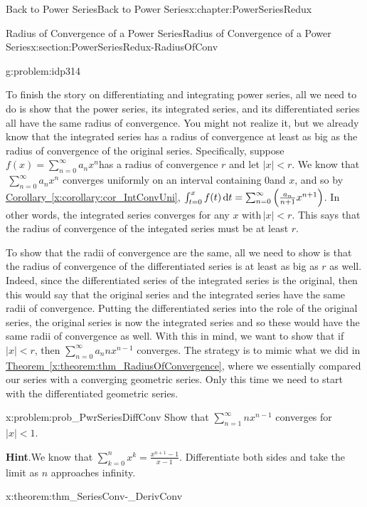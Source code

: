 \begin{chapterptx}{Back to Power Series}{}{Back to Power Series}{}{}{x:chapter:PowerSeriesRedux}
\begin{sectionptx}{Radius of Convergence of a Power Series}{}{Radius of Convergence of a Power Series}{}{}{x:section:PowerSeriesRedux-RadiusOfConv}
\begin{problem}{}{g:problem:idp314}
		\end{problem}
		To finish the story on differentiating and integrating power series, all we need to do is show that the power series, its integrated series, and its differentiated series all have the same radius of convergence. You might not realize it, but we already know that the integrated series has a radius of convergence at least as big as the radius of convergence of the original series. Specifically, suppose \(f(x)=\sum_{n=0}^\infty a_nx^n\)has a radius of convergence \(r\) and let \(|x|\lt r\). We know that \(\,\sum_{n=0}^\infty a_nx^n\) converges uniformly on an interval containing \(0\)and \(x\), and so by \hyperref[x:corollary:cor_IntConvUni]{Corollary~{\xreffont\ref{x:corollary:cor_IntConvUni}}}, \(\int_{t=0}^xf(t)\,{\rm d} t=\sum_{n=0}^\infty\left(\frac{a_n}{n+1}x^{n+1}\right)\). In other words, the integrated series converges for any \(x\) with\(\,|x|\lt r\). This says that the radius of convergence of the integated series must be at least \(r\).%
		\par
		To show that the radii of convergence are the same, all we need to show is that the radius of convergence of the differentiated series is at least as big as \(r\) as well. Indeed, since the differentiated series of the integrated series is the original, then this would say that the original series and the integrated series have the same radii of convergence. Putting the differentiated series into the role of the original series, the original series is now the integrated series and so these would have the same radii of convergence as well. With this in mind, we want to show that if \(|x|\lt r\), then \(\sum_{n=0}^\infty a_nnx^{n-1}\) converges. The strategy is to mimic what we did in \hyperref[x:theorem:thm_RadiusOfConvergence]{Theorem~{\xreffont\ref{x:theorem:thm_RadiusOfConvergence}}}, where we essentially compared our series with a converging geometric series. Only this time we need to start with the differentiated geometric series.%
		\begin{problem}{}{x:problem:prob_PwrSeriesDiffConv}%
			Show that \(\sum_{n=1}^\infty nx^{n-1}\) converges for \(|x|\lt 1\).%
			\par\smallskip%
			\noindent\textbf{\blocktitlefont Hint}.\hypertarget{g:hint:idp316}{}\quad{}We know that \(\sum_{k=0}^nx^k=\frac{x^{n+1}-1}{x-1}\). Differentiate both sides and take the limit as \(n\) approaches infinity.%
		\end{problem}
		\begin{theorem}{}{}{x:theorem:thm_SeriesConv-_DerivConv}%

\end{theorem}
\end{sectionptx}
\end{chapterptx}
